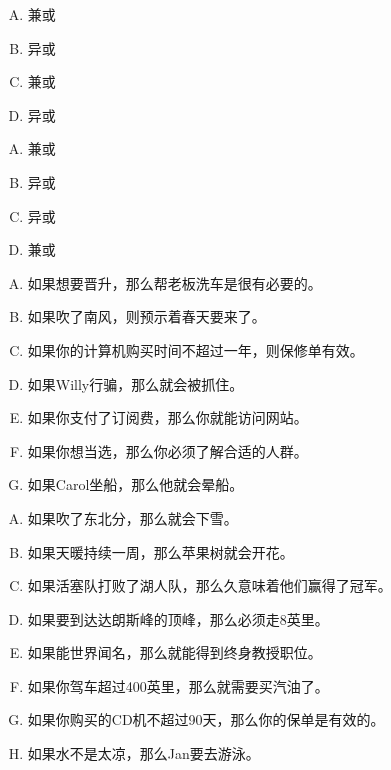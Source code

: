 {{        %
        \begin{practices}
            \begin{enumerate}[A.]
                \item 兼或
                \item 异或
                \item 兼或
                \item 异或
            \end{enumerate}
        \end{practices}

        \begin{practices}
            \begin{enumerate}[A.]
                \item 兼或
                \item 异或
                \item 异或
                \item 兼或
            \end{enumerate}
        \end{practices}

        \begin{practices}
            \begin{enumerate}[A.]
                \item 如果想要晋升，那么帮老板洗车是很有必要的。
                \item 如果吹了南风，则预示着春天要来了。
                \item 如果你的计算机购买时间不超过一年，则保修单有效。
                \item 如果Willy行骗，那么就会被抓住。
                \item 如果你支付了订阅费，那么你就能访问网站。
                \item 如果你想当选，那么你必须了解合适的人群。
                \item 如果Carol坐船，那么他就会晕船。
            \end{enumerate}
        \end{practices}

        \begin{practices}
            \begin{enumerate}[A.]
                \item 如果吹了东北分，那么就会下雪。
                \item 如果天暖持续一周，那么苹果树就会开花。
                \item 如果活塞队打败了湖人队，那么久意味着他们赢得了冠军。
                \item 如果要到达达朗斯峰的顶峰，那么必须走8英里。
                \item 如果能世界闻名，那么就能得到终身教授职位。
                \item 如果你驾车超过400英里，那么就需要买汽油了。
                \item 如果你购买的CD机不超过90天，那么你的保单是有效的。
                \item 如果水不是太凉，那么Jan要去游泳。
            \end{enumerate}
        \end{practices}

}}
